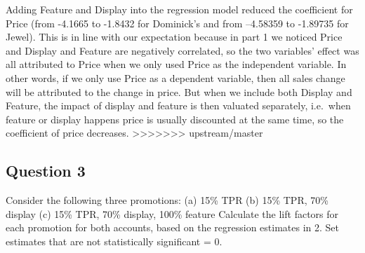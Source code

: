 \documentclass[]{article}
\begin{document}
Adding Feature and Display into the regression model reduced the
coefficient for Price (from -4.1665 to -1.8432 for Dominick's and from
--4.58359 to -1.89735 for Jewel). This is in line with our expectation
because in part 1 we noticed Price and Display and Feature are
negatively correlated, so the two variables' effect was all attributed
to Price when we only used Price as the independent variable. In other
words, if we only use Price as a dependent variable, then all sales
change will be attributed to the change in price. But when we include
both Display and Feature, the impact of display and feature is then
valuated separately, i.e.~when feature or display happens price is
usually discounted at the same time, so the coefficient of price
decreases.
\textgreater{}\textgreater{}\textgreater{}\textgreater{}\textgreater{}\textgreater{}\textgreater{}
upstream/master

\newpage

\hypertarget{question-3}{%
\subsection{Question 3}\label{question-3}}

Consider the following three promotions: \newline (a) 15\% TPR \newline
(b) 15\% TPR, 70\% display \newline (c) 15\% TPR, 70\% display, 100\%
feature \newline Calculate the lift factors for each promotion for both
accounts, based on the regression estimates in 2. Set estimates that are
not statistically significant = 0.
\end{document}
